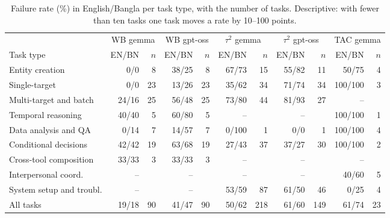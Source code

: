 \documentclass[11pt]{article}
\begin{document}
\begin{table}[t]
\centering\footnotesize
\setlength{\tabcolsep}{4pt}
\begin{tabular}{l rr rr rr rr rr}
\toprule
 & \multicolumn{2}{c}{WB gemma} & \multicolumn{2}{c}{WB gpt-oss} & \multicolumn{2}{c}{$\tau^2$ gemma}
 & \multicolumn{2}{c}{$\tau^2$ gpt-oss} & \multicolumn{2}{c}{TAC gemma} \\
\cmidrule(lr){2-3}\cmidrule(lr){4-5}\cmidrule(lr){6-7}\cmidrule(lr){8-9}\cmidrule(lr){10-11}
Task type & EN/BN & $n$ & EN/BN & $n$ & EN/BN & $n$ & EN/BN & $n$ & EN/BN & $n$ \\
\midrule
Entity creation          & 0/0   & 8  & 38/25 & 8  & 67/73 & 15 & 55/82 & 11 & 50/75   & 4 \\
Single-target            & 0/0   & 23 & 13/26 & 23 & 35/62 & 34 & 71/74 & 34 & 100/100 & 3 \\
Multi-target and batch   & 24/16 & 25 & 56/48 & 25 & 73/80 & 44 & 81/93 & 27 & -- & \\
Temporal reasoning       & 40/40 & 5  & 60/80 & 5  & -- & & -- & & 100/100 & 1 \\
Data analysis and QA     & 0/14  & 7  & 14/57 & 7  & 0/100 & 1  & 0/0   & 1  & 100/100 & 4 \\
Conditional decisions    & 42/42 & 19 & 63/68 & 19 & 27/43 & 37 & 37/27 & 30 & 100/100 & 2 \\
Cross-tool composition   & 33/33 & 3  & 33/33 & 3  & -- & & -- & & -- & \\
Interpersonal coord.     & -- & & -- & & -- & & -- & & 40/60 & 5 \\
System setup and troubl. & -- & & -- & & 53/59 & 87 & 61/50 & 46 & 0/25 & 4 \\
\midrule
All tasks                & 19/18 & 90 & 41/47 & 90 & 50/62 & 218 & 61/60 & 149 & 61/74 & 23 \\
\bottomrule
\end{tabular}
\caption{Failure rate (\%) in English/Bangla per task type, with the number of tasks. Descriptive:
with fewer than ten tasks one task moves a rate by 10--100 points.}
\label{tab:percat}
\end{table}
\end{document}
